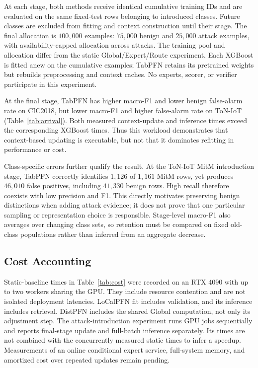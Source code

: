 \documentclass[sigconf,anonymous,pbalance]{acmart}
\begin{document}
At each stage, both methods receive identical cumulative training IDs and are evaluated on the same fixed-test rows belonging to introduced classes. Future classes are excluded from fitting and context construction until their stage. The final allocation is $100{,}000$ examples: $75{,}000$ benign and $25{,}000$ attack examples, with availability-capped allocation across attacks. The training pool and allocation differ from the static Global/Expert/Route experiment. Each XGBoost is fitted anew on the cumulative examples; TabPFN retains its pretrained weights but rebuilds preprocessing and context caches. No experts, scorer, or verifier participate in this experiment.



At the final stage, TabPFN has higher macro-F1 and lower benign false-alarm rate on CIC2018, but lower macro-F1 and higher false-alarm rate on ToN-IoT (Table~\ref{tab:arrival}). Both measured context-update and inference times exceed the corresponding XGBoost times. Thus this workload demonstrates that context-based updating is executable, but not that it dominates refitting in performance or cost.

Class-specific errors further qualify the result. At the ToN-IoT MitM introduction stage, TabPFN correctly identifies $1{,}126$ of $1{,}161$ MitM rows, yet produces $46{,}010$ false positives, including $41{,}330$ benign rows. High recall therefore coexists with low precision and F1. This directly motivates preserving benign distinctions when adding attack evidence; it does not prove that one particular sampling or representation choice is responsible. Stage-level macro-F1 also averages over changing class sets, so retention must be compared on fixed old-class populations rather than inferred from an aggregate decrease.

\subsection{Cost Accounting}

Static-baseline times in Table~\ref{tab:cost} were recorded on an RTX 4090 with up to two workers sharing the GPU. They include resource contention and are not isolated deployment latencies. LoCalPFN fit includes validation, and its inference includes retrieval. DistPFN includes the shared Global computation, not only its adjustment step. The attack-introduction experiment runs GPU jobs sequentially and reports final-stage update and full-batch inference separately. Its times are not combined with the concurrently measured static times to infer a speedup. Measurements of an online conditional expert service, full-system memory, and amortized cost over repeated updates remain pending.
\end{document}
